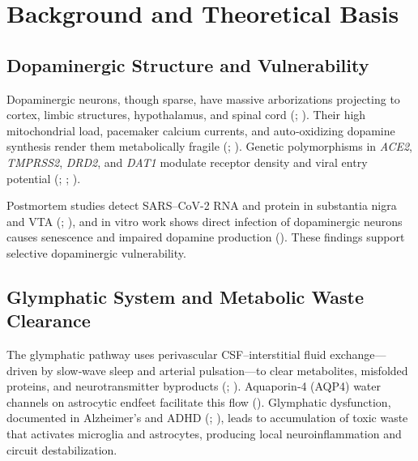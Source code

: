 \documentclass[12pt]{article}
\begin{document}
\section{Background and Theoretical Basis}
\subsection{Dopaminergic Structure and Vulnerability}
Dopaminergic neurons, though sparse, have massive arborizations projecting to cortex, limbic structures, hypothalamus, and spinal cord (\citealp{Brundin2020}; \citealp{Cappelletti2023}).  Their high mitochondrial load, pacemaker calcium currents, and auto‐oxidizing dopamine synthesis render them metabolically fragile (\citealp{Limanaqi2022}; \citealp{Nataf2020}).  Genetic polymorphisms in \textit{ACE2}, \textit{TMPRSS2}, \textit{DRD2}, and \textit{DAT1} modulate receptor density and viral entry potential (\citealp{Asselta2020}; \citealp{Eisenstein2016}; \citealp{Novelli2020}).  

Postmortem studies detect SARS–CoV-2 RNA and protein in substantia nigra and VTA (\citealp{Song2021}; \citealp{Lee2024}), and in vitro work shows direct infection of dopaminergic neurons causes senescence and impaired dopamine production (\citealp{Weill2024}).  These findings support selective dopaminergic vulnerability.

\subsection{Glymphatic System and Metabolic Waste Clearance}
The glymphatic pathway uses perivascular CSF–interstitial fluid exchange—driven by slow‐wave sleep and arterial pulsation—to clear metabolites, misfolded proteins, and neurotransmitter byproducts (\citealp{Iliff2012}; \citealp{Xie2013}).  Aquaporin‐4 (AQP4) water channels on astrocytic endfeet facilitate this flow (\citealp{TarasoffConway2015}).  Glymphatic dysfunction, documented in Alzheimer’s and ADHD (\citealp{Rennison2024}; \citealp{Taoka2017}), leads to accumulation of toxic waste that activates microglia and astrocytes, producing local neuroinflammation and circuit destabilization.
\end{document}
